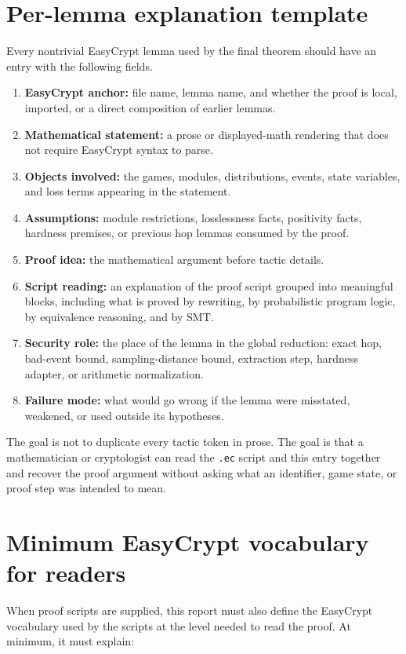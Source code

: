 \documentclass[11pt]{report}
\DeclareRobustCommand{\file}[1]{\ifmmode\text{\nolinkurl{#1}}\else\nolinkurl{#1}\fi}
\theoremstyle{definition}
\theoremstyle{plain}
\begin{document}
\section{Per-lemma explanation template}

Every nontrivial EasyCrypt lemma used by the final theorem should have an entry
with the following fields.

\begin{enumerate}
\item \textbf{EasyCrypt anchor:} file name, lemma name, and whether the proof is
local, imported, or a direct composition of earlier lemmas.
\item \textbf{Mathematical statement:} a prose or displayed-math rendering that
does not require EasyCrypt syntax to parse.
\item \textbf{Objects involved:} the games, modules, distributions, events,
state variables, and loss terms appearing in the statement.
\item \textbf{Assumptions:} module restrictions, losslessness facts, positivity
facts, hardness premises, or previous hop lemmas consumed by the proof.
\item \textbf{Proof idea:} the mathematical argument before tactic details.
\item \textbf{Script reading:} an explanation of the proof script grouped into
meaningful blocks, including what is proved by rewriting, by probabilistic
program logic, by equivalence reasoning, and by SMT.
\item \textbf{Security role:} the place of the lemma in the global reduction:
exact hop, bad-event bound, sampling-distance bound, extraction step, hardness
adapter, or arithmetic normalization.
\item \textbf{Failure mode:} what would go wrong if the lemma were misstated,
weakened, or used outside its hypotheses.
\end{enumerate}

The goal is not to duplicate every tactic token in prose.  The goal is that a
mathematician or cryptologist can read the \file{.ec} script and this entry
together and recover the proof argument without asking what an identifier, game
state, or proof step was intended to mean.

\section{Minimum EasyCrypt vocabulary for readers}

When proof scripts are supplied, this report must also define the EasyCrypt
vocabulary used by the scripts at the level needed to read the proof.  At
minimum, it must explain:
\end{document}
